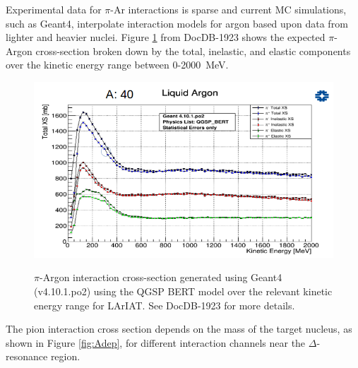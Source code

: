 Experimental data for $\pi$-Ar interactions is sparse and current MC simulations, such as Geant4, interpolate interaction models for argon based upon data from lighter and heavier nuclei.  Figure \ref{fig:Geant4CrossSection} from DocDB-1923 shows the expected $\pi$-Argon cross-section broken down by the total, inelastic, and elastic components over the kinetic energy range between 0-2000~MeV.

\begin{figure}[ht!]
\centering
\includegraphics[scale=0.45]{./images/ArgonPionCrossSection.png}\\
\caption{$\pi$-Argon interaction cross-section generated using Geant4 (v4.10.1.po2) using the QGSP BERT model over the relevant kinetic energy range for LArIAT. See DocDB-1923 for more details.}
\label{fig:Geant4CrossSection}
\end{figure}

The pion interaction cross section depends on the mass of the target nucleus, as shown in Figure \ref{fig:Adep}, for different interaction channels near the $\Delta$-resonance region.

